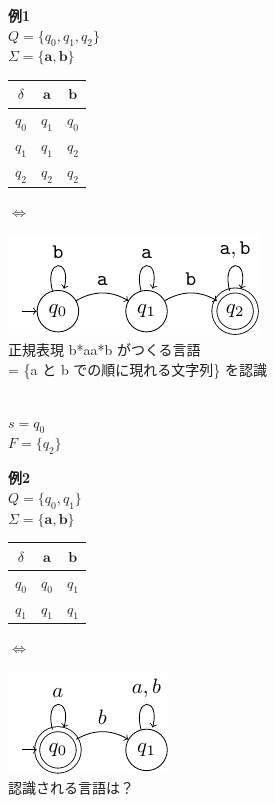 \documentclass[main]{subfiles}
\begin{document}
\begin{tcolorbox}[
  enhanced,
  coltitle=black,
  attach boxed title to top left={xshift=3mm, yshift=-\tcboxedtitleheight/2},
  colback=white,
  title=DFA の例:,
  boxed title style={size=small,colframe=white,colback=white}
]
\small
\textbf{例1}\\
$Q = \{q_0, q_1, q_2\}$\\
$\Sigma = \{\mathbf{a,b}\}$\\[-14pt]
\begin{tabular}{c|cc}
$\delta$ & $\mathbf{a}$ & $\mathbf{b}$ \\
\hline
$q_0$ & $q_1$ & $q_0$ \\
$q_1$ & $q_1$ & $q_2$ \\
$q_2$ & $q_2$ & $q_2$ \\
\end{tabular}
\hspace{5mm} $\Leftrightarrow$
\begin{minipage}{0.45\textwidth}
  \includegraphics{figures/dfa1.pdf}\\[2mm]
  \small{正規表現 b*aa*b がつくる言語 \\= \{a と b での順に現れる文字列\} を認識}
\end{minipage}\\[-20pt]

$s = q_0$\\
$F = \{q_2\}$

\textbf{例2}\\
$Q = \{q_0, q_1\}$\\
$\Sigma = \{\mathbf{a,b}\}$\\[-14pt]
\begin{tabular}{c|cc}
$\delta$ & $\mathbf{a}$ & $\mathbf{b}$ \\
\hline
$q_0$ & $q_0$ & $q_1$ \\
$q_1$ & $q_1$ & $q_1$ \\
\end{tabular}
\hspace{5mm} $\Leftrightarrow$ 
\begin{minipage}{0.45\textwidth}
  
  \includegraphics{figures/dfa2.pdf}\\[2mm]
  \small{認識される言語は？}
\end{minipage}\\[-20pt]


\end{tcolorbox}
\end{document}
